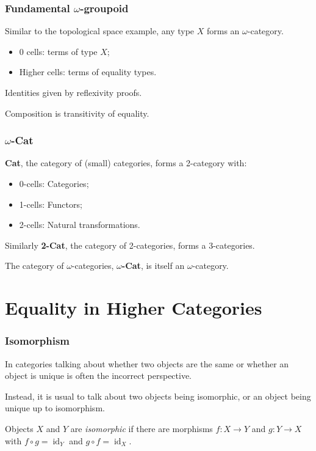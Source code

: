 \documentclass[presentation]{beamer}
\DeclareMathOperator{\id}{id}
\begin{document}
\begin{frame}
  \frametitle{Fundamental \(\omega\)-groupoid}
  Similar to the topological space example, any type \(X\) forms an \(\omega\)-category.

  \pause{}
  \begin{itemize}
  \item 0 cells: terms of type \(X\);
  \item Higher cells: terms of equality types.
  \end{itemize}

  \pause{}
  Identities given by reflexivity proofs.

  \pause{}
  Composition is transitivity of equality.
\end{frame}

\begin{frame}
  \frametitle{\(\omega\)-\textbf{Cat}}
  \textbf{Cat}, the category of (small) categories, forms a 2-category with:
  \begin{itemize}
  \item 0-cells: Categories;
  \item 1-cells: Functors;
  \item 2-cells: Natural transformations.
  \end{itemize}

  \pause{}
  Similarly \textbf{2-Cat}, the category of 2-categories, forms a 3-categories.

  \pause{}
  The category of \(\omega\)-categories, \textbf{\(\omega\)-Cat}, is itself an \(\omega\)-category.
\end{frame}

\section{Equality in Higher Categories}

\begin{frame}
  \frametitle{Isomorphism}
  In categories talking about whether two objects are the same or whether an object is unique is often the incorrect perspective.

  \pause{}
  Instead, it is usual to talk about two objects being isomorphic, or an object being unique up to isomorphism.
  \begin{definition}
    Objects \(X\) and \(Y\) are \emph{isomorphic} if there are morphisms \(f : X \to Y\) and \(g : Y \to X\) with \(f \circ g = \id_Y\) and \(g \circ f = \id_X\).
  \end{definition}
\end{frame}
\end{document}

